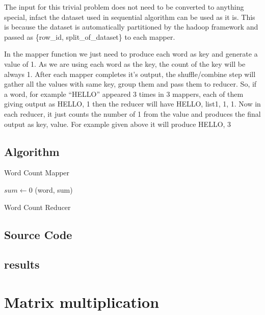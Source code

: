 \documentclass{article}
\begin{document}
The input for this trivial problem does not need to be converted to anything special, infact the dataset used in sequential algorithm can be used as it is. This is because the dataset is automatically partitioned by the hadoop framework and passed as \{row\_id, split\_of\_dataset\} to each mapper.

In the mapper function we just need to produce each word as key and generate a value of 1. As we are using each word as the key, the count of the key will be always 1.
After each mapper completes it’s output, the shuffle/combine step will gather all the values with same key, group them and pass them to reducer.
So, if a word, for example “HELLO” appeared 3 times in 3 mappers, each of them giving output as {HELLO, 1} then the reducer will have {HELLO, list{1, 1, 1}}. Now in each reducer, it just counts the number of 1 from the value and produces the final output as {key, value}. For example given above it will produce {HELLO, 3}

\subsection{Algorithm}

\IncMargin{1em}
\begin{algorithm}
\DontPrintSemicolon
{}
\BlankLine
{}
\caption{Word Count Mapper\label{IR}}
\end{algorithm}
\DecMargin{1em}

\IncMargin{1em}
\begin{algorithm}
\DontPrintSemicolon
{}
\BlankLine
$sum\leftarrow $0\;
\emit(word, sum)\;
\caption{Word Count Reducer\label{IR}}
\end{algorithm}
\DecMargin{1em}

\subsection{Source Code}
\subsection{results}

\section{Matrix multiplication}
\end{document}
